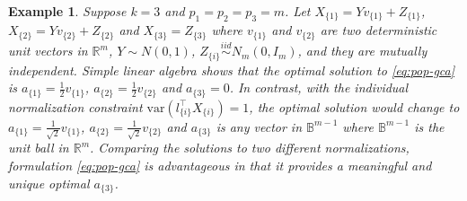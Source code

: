 \documentclass[11pt]{article}
\newcommand{\nb}[1]{\textcolor{orange}{\texttt{[#1]}}}
\newcommand{\dc}[1]{\{#1\}} %
\newcommand{\0}{{\mathbf{0}}}
\newtheorem{example}[theorem]{Example}
\begin{document}
\begin{example}
\label{example:normalization}
Suppose $k = 3$ and $p_1= p_2 = p_3 = m$. 
Let $X_{\dc{1}} = Y v_{\dc{1}} + Z_{\dc{1}} $, 
$X_{\dc{2}} = Y v_{\dc{2}} + Z_{\dc{2}}$  and $X_{\dc{3}} = Z_{\dc{3}}$ where $v_{\dc{1}}$ and $v_{\dc{2}}$ are two deterministic unit vectors in 
$\mathbb{R}^m$, 
$Y\sim N(0,1)$, 
$Z_{\dc{i}} \stackrel{iid}{\sim} N_m(0, I_m)$, 
and they are mutually independent. 
Simple linear algebra shows that the optimal solution to \eqref{eq:pop-gca} is 
$a_{\dc{1}} =  \frac{1}{2}v_{\dc{1}}$, 
$a_{\dc{2}} =  \frac{1}{2}v_{\dc{2}}$ and 
$a_{\dc{3}} = 0$. 
In contrast, with the individual normalization constraint 
$\mathrm{var}(l_{\dc{i}}^\top  X_{\dc{i}}) = 1$, the optimal solution would change to $a_{\dc{1}} = \frac{1}{\sqrt{2}}v_{\dc{1}}$, 
$a_{\dc{2}} = \frac{1}{\sqrt{2}}v_{\dc{2}}$ and 
$a_{\dc{3}}$ is any vector in $\mathbb{B}^{m-1}$ 
where $\mathbb{B}^{m-1}$ is the unit ball in $\mathbb{R}^m$.
Comparing the solutions to two different normalizations, formulation \eqref{eq:pop-gca} is advantageous in that it provides a meaningful and unique optimal $a_{\dc{3}}$.
\end{example}
\end{document}
